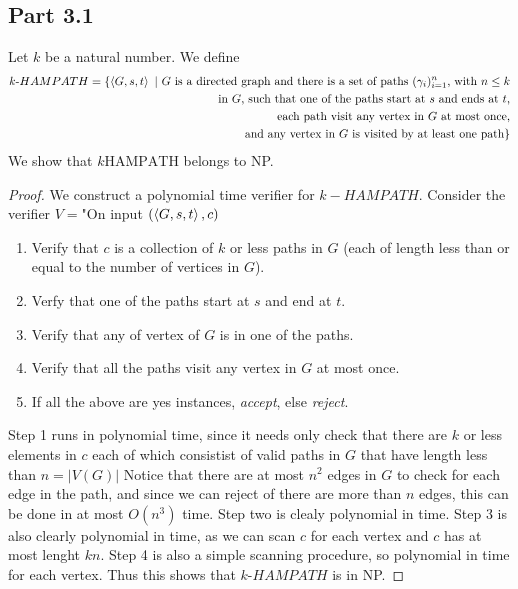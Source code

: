 \documentclass[a4paper,11pt]{article}
\newcommand{\abs}[1]{\left\lvert #1 \right\rvert}
\newcommand{\pipe}{\ \vert \ }
\numberwithin{equation}{section}
\begin{document}
\subsection*{Part 3.1}
Let $ k $ be a natural number. We define \begin{equation*}
\begin{aligned}
	k\text{-}HAMPATH=\{\braket{G,s,t}\pipe G\text{ is a directed graph and there is a set of paths $ (\gamma_i)_{i=1}^{n} $, with $ n\leq k $}\\\text{in $ G $, such that one of the paths start at $ s $ and ends at $ t $,}\\\text{each path visit any vertex in $ G $ at most once,}\\\text{and any vertex in $ G $ is visited by at least one path} \}
\end{aligned}
\end{equation*}
We show that $ k\text{HAMPATH} $ belongs to NP. \begin{proof}
	We construct a polynomial time verifier for $ k-HAMPATH $. Consider the verifier $ V= $"On input $ (\braket{G,s,t},c) $\begin{enumerate}
		\item Verify that $ c $ is a collection of $ k $ or less paths in $ G $ (each of length less than or equal to the number of vertices in $ G $).
		\item Verfy that one of the paths start at $ s $ and end at $ t $.
		\item Verify that any of vertex of $ G $ is in one of the paths.
		\item Verify that all the paths visit any vertex in $ G $ at most once.
		\item If all the above are yes instances, \emph{accept}, else \emph{reject}.
	\end{enumerate}
	Step 1 runs in polynomial time, since it needs only check that there are $ k $ or less elements in $ c $ each of which consistist of valid paths in $ G $ that have length less than $ n=\abs{V(G)} $ Notice that there are at most $ n^2 $ edges in $ G $ to check for each edge in the path, and since we can reject of there are more than $ n $ edges, this can be done in at most $ O(n^3) $ time.  Step two is clealy polynomial in time. Step 3 is also clearly polynomial in time, as we can scan $ c $ for each vertex and $ c $ has at most lenght $ kn $. Step 4 is also a simple scanning procedure, so polynomial in time for each vertex. Thus this shows that $ k\text{-}HAMPATH $ is in NP. 
\end{proof}
\end{document}

